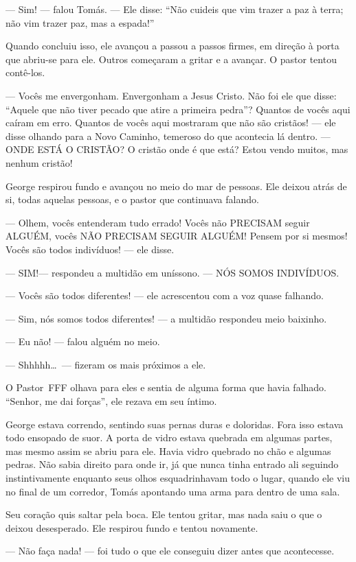 --- Sim! --- falou Tomás. --- Ele disse: ``Não cuideis que vim trazer a paz à terra; não vim trazer paz, mas a espada!''

Quando concluiu isso, ele avançou a passou a passos firmes, em direção à porta\mudanca{,} que abriu-se para ele. Outros começaram a gritar e a avançar. O pastor tentou contê-los.

--- Vocês me envergonham. Envergonham a Jesus Cristo. Não foi ele que disse: ``Aquele que não tiver pecado que atire a primeira pedra''? Quantos de vocês aqui caíram em erro. Quantos de vocês aqui mostraram que não são cristãos! --- ele disse olhando para a Novo Caminho, temeroso do que acontecia lá dentro. --- ONDE ESTÁ O CRISTÃO? O cristão onde é que está? Estou vendo muitos, mas nenhum cristão!

George respirou fundo e avançou no meio do mar de pessoas. Ele deixou atrás de si, todas aquelas pessoas, e o pastor que continuava falando.

--- Olhem, vocês entenderam tudo errado! Vocês não PRECISAM seguir ALGUÉM, vocês NÃO PRECISAM SEGUIR ALGUÉM! Pensem por si mesmos! Vocês são todos indivíduos! --- ele disse.

--- SIM!--- respondeu a multidão em uníssono. --- NÓS SOMOS INDIVÍDUOS.

--- Vocês são todos diferentes! --- ele acrescentou\mudanca{,} com a voz quase falhando.

--- Sim, nós somos todos diferentes! --- a multidão respondeu\mudanca{,} meio baixinho.

--- Eu não! --- falou alguém no meio.

--- Shhhhh\ldots~--- fizeram os mais próximos a ele.

O Pastor~FFF olhava para eles e sentia de alguma forma que havia falhado. ``Senhor, me dai forças'', ele rezava\mudanca{,} em seu íntimo.

George estava correndo, sentindo suas pernas duras e doloridas. Fora isso\mudanca{,} estava todo ensopado de suor. A porta de vidro estava quebrada em algumas partes, mas mesmo assim se abriu para ele. Havia vidro quebrado no chão e algumas pedras. Não sabia direito para onde ir, já que nunca tinha entrado ali seguindo instintivamente\mudanca{,} enquanto seus olhos esquadrinhavam todo o lugar, quando ele viu\mudanca{,} no final de um corredor, Tomás\mudanca{,} apontando uma arma para dentro de uma sala.

Seu coração quis saltar pela boca. Ele tentou gritar, mas nada saiu\mudanca{,} o que o deixou desesperado. Ele respirou fundo e tentou novamente.

--- Não faça nada! --- foi tudo o que ele conseguiu dizer antes que acontecesse.
